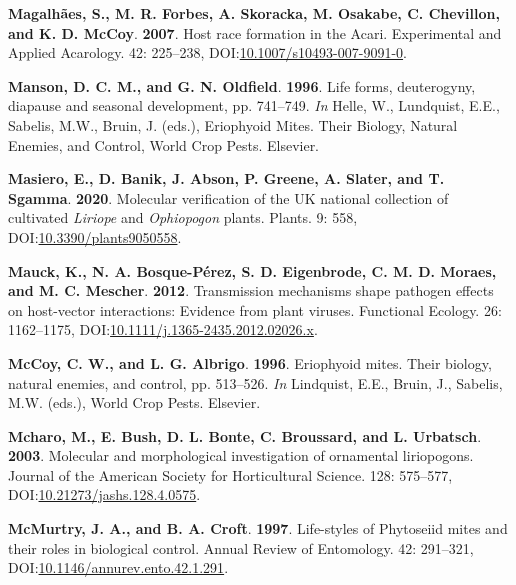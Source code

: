 \documentclass[12pt,final,CPage]{ufthesis}
\newlength{\cslhangindent}
\newenvironment{CSLReferences}[2] %
{%
	\setlength{\parindent}{0pt}
	\ifodd #1 \everypar{\setlength{\hangindent}{\cslhangindent}}\ignorespaces\fi
	\ifnum #2 > 0
	\setlength{\parskip}{#2\baselineskip}
	\fi
}%
{}
\begin{document}
{\begin{CSLReferences}{1}{0}
  \leavevmode{}%
  \textbf{Magalhães, S., M. R. Forbes, A. Skoracka, M. Osakabe, C. Chevillon, and K. D. McCoy}. \textbf{2007}. Host race formation in the {Acari}. Experimental and Applied Acarology. 42: 225--238, DOI:\href{https://doi.org/10.1007/s10493-007-9091-0}{10.1007/s10493-007-9091-0}.

  \leavevmode{}%
  \textbf{Manson, D. C. M., and G. N. Oldfield}. \textbf{1996}. Life forms, deuterogyny, diapause and seasonal development, pp. 741--749. \emph{In} Helle, W., Lundquist, E.E., Sabelis, M.W., Bruin, J. (eds.), Eriophyoid Mites. Their Biology, Natural Enemies, and Control, World Crop Pests. Elsevier.

  \leavevmode{}%
  \textbf{Masiero, E., D. Banik, J. Abson, P. Greene, A. Slater, and T. Sgamma}. \textbf{2020}. Molecular verification of the {UK} national collection of cultivated {\emph{Liriope}} and {\emph{Ophiopogon}} plants. Plants. 9: 558, DOI:\href{https://doi.org/10.3390/plants9050558}{10.3390/plants9050558}.

  \leavevmode{}%
  \textbf{Mauck, K., N. A. Bosque-Pérez, S. D. Eigenbrode, C. M. D. Moraes, and M. C. Mescher}. \textbf{2012}. Transmission mechanisms shape pathogen effects on host-vector interactions: Evidence from plant viruses. Functional Ecology. 26: 1162--1175, DOI:\href{https://doi.org/10.1111/j.1365-2435.2012.02026.x}{10.1111/j.1365-2435.2012.02026.x}.

  \leavevmode{}%
  \textbf{McCoy, C. W., and L. G. Albrigo}. \textbf{1996}. Eriophyoid mites. Their biology, natural enemies, and control, pp. 513--526. \emph{In} Lindquist, E.E., Bruin, J., Sabelis, M.W. (eds.), World Crop Pests. Elsevier.

  \leavevmode{}%
  \textbf{Mcharo, M., E. Bush, D. L. Bonte, C. Broussard, and L. Urbatsch}. \textbf{2003}. Molecular and morphological investigation of ornamental liriopogons. Journal of the American Society for Horticultural Science. 128: 575--577, DOI:\href{https://doi.org/10.21273/jashs.128.4.0575}{10.21273/jashs.128.4.0575}.

  \leavevmode{}%
  \textbf{McMurtry, J. A., and B. A. Croft}. \textbf{1997}. Life-styles of {Phytoseiid} mites and their roles in biological control. Annual Review of Entomology. 42: 291--321, DOI:\href{https://doi.org/10.1146/annurev.ento.42.1.291}{10.1146/annurev.ento.42.1.291}.


\end{CSLReferences}}
\end{document}
